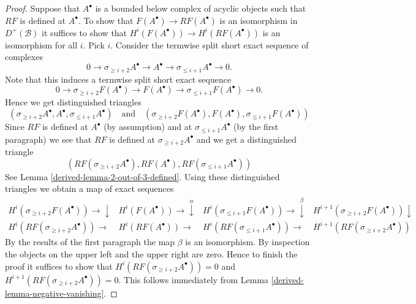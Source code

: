 \begin{proof}
\medskip\noindent
Suppose that $A^\bullet$ is a bounded below complex of acyclic objects
such that $RF$ is defined at $A^\bullet$.
To show that $F(A^\bullet) \to RF(A^\bullet)$
is an isomorphism in $D^{+}(\mathcal{B})$
it suffices to show that $H^i(F(A^\bullet)) \to H^i(RF(A^\bullet))$
is an isomorphism for
all $i$. Pick $i$. Consider the termwise split short exact sequence of
complexes
$$
0 \to \sigma_{\geq i + 2} A^\bullet \to A^\bullet \to
\sigma_{\leq i + 1} A^\bullet \to 0.
$$
Note that this induces a termwise split short exact sequence
$$
0 \to \sigma_{\geq i + 2} F(A^\bullet) \to F(A^\bullet) \to
\sigma_{\leq i + 1} F(A^\bullet) \to 0.
$$
Hence we get distinguished triangles
$$
(\sigma_{\geq i + 2} A^\bullet, A^\bullet,
\sigma_{\leq i + 1} A^\bullet)
\quad\text{and}\quad
(\sigma_{\geq i + 2} F(A^\bullet), F(A^\bullet),
\sigma_{\leq i + 1} F(A^\bullet))
$$
Since $RF$ is defined at $A^\bullet$ (by assumption)
and at $\sigma_{\leq i + 1}A^\bullet$ (by the first paragraph)
we see that $RF$ is defined at $\sigma_{\geq i + 2}A^\bullet$
and we get a distinguished triangle
$$
(RF(\sigma_{\geq i + 2} A^\bullet), RF(A^\bullet),
RF(\sigma_{\leq i + 1} A^\bullet))
$$
See Lemma \ref{derived-lemma-2-out-of-3-defined}.
Using these distinguished triangles we obtain a map of exact sequences
$$
\begin{array}{cccc}H^i(\sigma_{\geq i + 2} F(A^\bullet)) \longrightarrow\downarrow & H^i(F(A^\bullet)) \longrightarrow\overset{\alpha}{\downarrow} & H^i(\sigma_{\leq i + 1} F(A^\bullet)) \longrightarrow\overset{\beta}{\downarrow} & H^{i + 1}(\sigma_{\geq i + 2} F(A^\bullet)) \downarrow \\ H^i(RF(\sigma_{\geq i + 2} A^\bullet)) \longrightarrow & H^i(RF(A^\bullet)) \longrightarrow & H^i(RF(\sigma_{\leq i + 1} A^\bullet)) \longrightarrow & H^{i + 1}(RF(\sigma_{\geq i + 2} A^\bullet))\end{array}
$$
By the results of the first paragraph the map $\beta$ is an isomorphism.
By inspection the objects on the upper left and the upper right
are zero. Hence to finish the proof it suffices to show that
$H^i(RF(\sigma_{\geq i + 2} A^\bullet)) = 0$ and
$H^{i + 1}(RF(\sigma_{\geq i + 2} A^\bullet)) = 0$.
This follows immediately from
Lemma \ref{derived-lemma-negative-vanishing}.
\end{proof}

